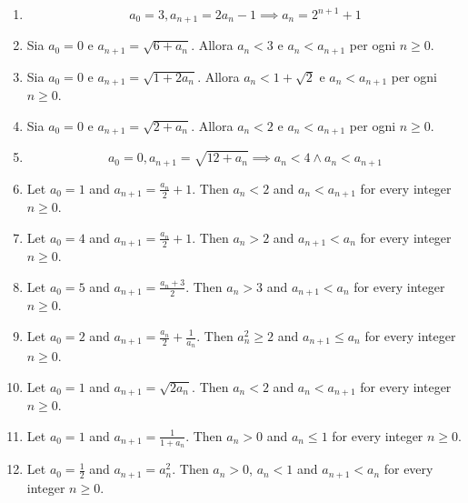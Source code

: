 \documentclass[11pt,a4paper]{article}
\begin{document}
\begin{enumerate}
\item \[ a_{0} = 3, a_{n + 1} = 2 a_{n} - 1 \implies a_{n} = 2^{n + 1} + 1 \]
\item Sia $a_0=0$ e $a_{n+1}=\sqrt{6+a_n}$. Allora $a_n<3$ e $a_n<a_{n+1}$ per ogni $n\ge0$.
\item Sia $a_0=0$ e $a_{n+1}=\sqrt{1+2a_n}$. Allora $a_n<1+\sqrt2$ e $a_n<a_{n+1}$ per ogni $n\ge0$.
\item Sia $a_0=0$ e $a_{n+1}=\sqrt{2+a_n}$. Allora $a_n<2$ e $a_n<a_{n+1}$ per ogni $n\ge0$.
\item \[ a_{0} = 0, a_{n + 1} = \sqrt{12 + a_{n}} \implies a_{n} < 4 \land a_{n} < a_{n + 1} \]
\item Let $a_0=1$ and $a_{n+1}=\frac{a_n}{2}+1$. Then $a_n<2$ and $a_n<a_{n+1}$ for every integer $n\ge0$.
\item Let $a_0=4$ and $a_{n+1}=\frac{a_n}{2}+1$. Then $a_n>2$ and $a_{n+1}<a_n$ for every integer $n\ge0$.
\item Let $a_0=5$ and $a_{n+1}=\frac{a_n+3}{2}$. Then $a_n>3$ and $a_{n+1}<a_n$ for every integer $n\ge0$.
\item Let $a_0=2$ and $a_{n+1}=\frac{a_n}{2}+\frac{1}{a_n}$. Then $a_n^2\ge2$ and $a_{n+1}\le a_n$ for every integer $n\ge0$.
\item Let $a_0=1$ and $a_{n+1}=\sqrt{2a_n}$. Then $a_n<2$ and $a_n<a_{n+1}$ for every integer $n\ge0$.
\item Let $a_0=1$ and $a_{n+1}=\frac{1}{1+a_n}$. Then $a_n>0$ and $a_n\le1$ for every integer $n\ge0$.
\item Let $a_0=\frac{1}{2}$ and $a_{n+1}=a_n^2$. Then $a_n>0$, $a_n<1$ and $a_{n+1}<a_n$ for every integer $n\ge0$.
\end{enumerate}
\end{document}
